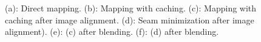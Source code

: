 \documentclass[10pt,twocolumn,letterpaper]{article}
\begin{document}
\begin{figure}
  \centering

  \centering

  \centering

  \centering

  \centering

  \centering
  \caption{(a): Direct mapping. (b): Mapping with caching. (c):
    Mapping with caching after image alignment. (d): Seam minimization after image alignment). (e): (c) after blending. (f): (d) after blending.}
  \label{fig:compareAll}
\end{figure}
\end{document}
